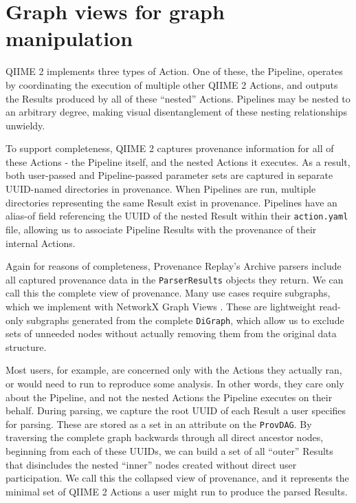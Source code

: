 \section{Graph views for graph manipulation}

QIIME 2 implements three types of Action. One of these, the Pipeline, operates
by coordinating the execution of multiple other QIIME 2 Actions, and outputs the
Results produced by all of these “nested” Actions. Pipelines may be nested to an
arbitrary degree, making visual disentanglement of these nesting relationships
unwieldy.

To support completeness, QIIME 2 captures provenance information for all of
these Actions - the Pipeline itself, and the nested Actions it executes. As a
result, both user-passed and Pipeline-passed parameter sets are captured in
separate UUID-named directories in provenance. When Pipelines are run, multiple
directories representing the same Result exist in provenance. Pipelines have an
alias-of field referencing the UUID of the nested Result within their
\texttt{action.yaml} file, allowing us to associate Pipeline Results with the provenance
of their internal Actions. 

Again for reasons of completeness, Provenance Replay’s Archive parsers include
all captured provenance data in the \texttt{ParserResults} objects they return. We can
call this the complete view of provenance. Many use cases require subgraphs,
which we implement with NetworkX Graph Views \parencite{hagberg_exploring_2008}.
These are lightweight read-only subgraphs generated from the complete \texttt{DiGraph},
which allow us to exclude sets of unneeded nodes without actually removing them
from the original data structure.

Most users, for example, are concerned only with the Actions they actually ran,
or would need to run to reproduce some analysis. In other words, they care only
about the Pipeline, and not the nested Actions the Pipeline executes on their
behalf. During parsing, we capture the root UUID of each Result a user specifies
for parsing. These are stored as a set in an attribute on the \texttt{ProvDAG}. By
traversing the complete graph backwards through all direct ancestor nodes,
beginning from each of these UUIDs, we can build a set of all “outer” Results
that disincludes the nested “inner” nodes created without direct user
participation. We call this the collapsed view of provenance, and it represents
the minimal set of QIIME 2 Actions a user might run to produce the parsed
Results.


